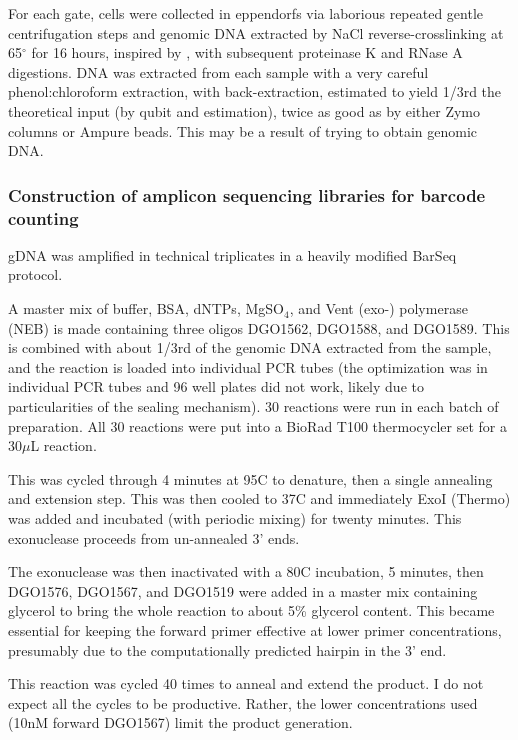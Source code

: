 For each gate, cells were collected in eppendorfs via laborious 
repeated gentle centrifugation steps and genomic
DNA extracted by NaCl reverse-crosslinking at 65$^{\circ}$ for 16
hours, inspired by \cite{klemm2014transcriptional}, with
subsequent proteinase K and RNase A digestions.
DNA was extracted from each sample with a very careful
phenol:chloroform extraction, with back-extraction, estimated to yield
1/3rd the theoretical input (by qubit and estimation), twice as good
as by either Zymo columns or Ampure beads. This may be a result of
trying to obtain genomic DNA.

\subsubsection{Construction of amplicon sequencing libraries for barcode counting}

gDNA was amplified in technical triplicates in a heavily modified 
BarSeq protocol.

A master mix of buffer, BSA, dNTPs, MgSO$_4$, and Vent (exo-)
polymerase (NEB) is made containing three oligos DGO1562, DGO1588, 
and DGO1589.
This is combined with about 1/3rd of the genomic DNA extracted
from the sample, and the reaction is loaded into individual PCR
tubes (the optimization was in individual PCR tubes and 96 well 
plates did not work, likely due to particularities of the sealing
mechanism).
30 reactions were run in each batch of preparation. All 30 reactions
were put into a BioRad T100 thermocycler set for a 30\(\mu\)L
reaction.

This was cycled through 4 minutes at 95C to denature, then a single
annealing and extension step. This was then cooled to 37C and
immediately ExoI (Thermo) was added and incubated (with periodic
mixing) for twenty minutes. This exonuclease proceeds from
un-annealed 3' ends. 


The exonuclease was then inactivated with a 80C incubation, 5 minutes,
then DGO1576, DGO1567, and DGO1519 were added in a master mix
containing glycerol to bring the whole reaction to about 5\% glycerol
content. This became essential for keeping the forward primer
effective at lower primer concentrations, presumably due to the
computationally predicted hairpin in the 3' end.

This reaction was cycled 40 times to anneal and extend the product.
I do not expect all the cycles to be productive. 
Rather, the lower concentrations used
(10nM forward DGO1567) limit the product generation.

